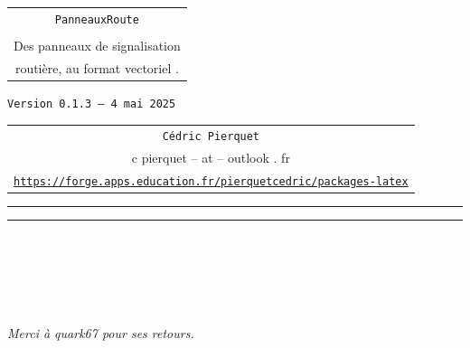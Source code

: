 \documentclass[french,11pt,a4paper]{article}
\def\TPversion{0.1.3}
\def\TPdate{4 mai 2025}
\begin{document}
\pagestyle{fancy}

\thispagestyle{empty}

\begin{center}
	\begin{minipage}{0.75\linewidth}
	\begin{tcolorbox}[colframe=yellow,colback=yellow!15]
		\begin{center}
			\begin{tabular}{c}
				{\Huge \texttt{PanneauxRoute}}\\
				\\
				{\LARGE Des panneaux de signalisation} \\
				{\LARGE routière, au format vectoriel .} \\
			\end{tabular}
			
			\medskip
			
			{\small \texttt{Version \TPversion{} -- \TPdate}}
		\end{center}
	\end{tcolorbox}
\end{minipage}
\end{center}

\begin{center}
	\begin{tabular}{c}
	\texttt{Cédric Pierquet}\\
	{\ttfamily c pierquet -- at -- outlook . fr}\\
	\texttt{\url{https://forge.apps.education.fr/pierquetcedric/packages-latex}}
\end{tabular}
\end{center}

\hrule


\hypertarget{matoc}{}

\tableofcontents

\vspace*{5mm}

\hrule

\vspace*{5mm}

\vfill

\hfill
\prPassNivVap[height=3cm]~~~~
\hfill~

\medskip

\hfill
\prDebAutor[scale=0.175]
\hfill~

\vfill~

\hfill{}\textsl{Merci à quark67 pour ses retours.}
\end{document}

